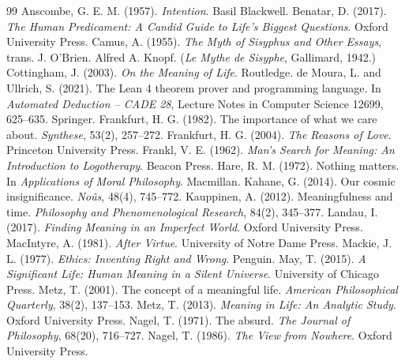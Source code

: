 \begin{thebibliography}{99}\small
{} Anscombe, G. E. M. (1957). \emph{Intention}. Basil Blackwell.
 Benatar, D. (2017). \emph{The Human Predicament: A Candid Guide to Life's Biggest Questions}. Oxford University Press.
 Camus, A. (1955). \emph{The Myth of Sisyphus and Other Essays}, trans. J. O'Brien. Alfred A. Knopf. (\emph{Le Mythe de Sisyphe}, Gallimard, 1942.)
 Cottingham, J. (2003). \emph{On the Meaning of Life}. Routledge.
 de Moura, L. and Ullrich, S. (2021). The Lean 4 theorem prover and programming language. In \emph{Automated Deduction -- CADE 28}, Lecture Notes in Computer Science 12699, 625--635. Springer.
 Frankfurt, H. G. (1982). The importance of what we care about. \emph{Synthese}, 53(2), 257--272.
 Frankfurt, H. G. (2004). \emph{The Reasons of Love}. Princeton University Press.
 Frankl, V. E. (1962). \emph{Man's Search for Meaning: An Introduction to Logotherapy}. Beacon Press.
 Hare, R. M. (1972). Nothing matters. In \emph{Applications of Moral Philosophy}. Macmillan.
 Kahane, G. (2014). Our cosmic insignificance. \emph{No\^us}, 48(4), 745--772.
 Kauppinen, A. (2012). Meaningfulness and time. \emph{Philosophy and Phenomenological Research}, 84(2), 345--377.
 Landau, I. (2017). \emph{Finding Meaning in an Imperfect World}. Oxford University Press.
 MacIntyre, A. (1981). \emph{After Virtue}. University of Notre Dame Press.
 Mackie, J. L. (1977). \emph{Ethics: Inventing Right and Wrong}. Penguin.
 May, T. (2015). \emph{A Significant Life: Human Meaning in a Silent Universe}. University of Chicago Press.
 Metz, T. (2001). The concept of a meaningful life. \emph{American Philosophical Quarterly}, 38(2), 137--153.
 Metz, T. (2013). \emph{Meaning in Life: An Analytic Study}. Oxford University Press.
 Nagel, T. (1971). The absurd. \emph{The Journal of Philosophy}, 68(20), 716--727.
 Nagel, T. (1986). \emph{The View from Nowhere}. Oxford University Press.

\end{thebibliography}

